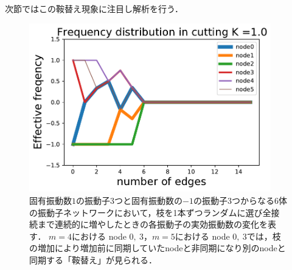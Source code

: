 \documentclass[../main]{subfiles}
\begin{document}
次節ではこの鞍替え現象に注目し解析を行う．
\begin{figure}[tbp]
\centering
\includegraphics[width=105mm]{./images/cutting_N6K1.pdf}
\centering
\caption{固有振動数$1$の振動子3つと固有振動数の$-1$の振動子3つからなる6体の振動子ネットワークにおいて，枝を1本ずつランダムに選び全接続まで連続的に増やしたときの各振動子の実効振動数の変化を表す．
$m=4$における node $0,\ 3$，$m=5$における node $0,\ 3$では，枝の増加により増加前に同期していたnodeと非同期になり別のnodeと同期する「鞍替え」が見られる．}
\label{fig:cutting_N6K1}
\end{figure}
\end{document}
